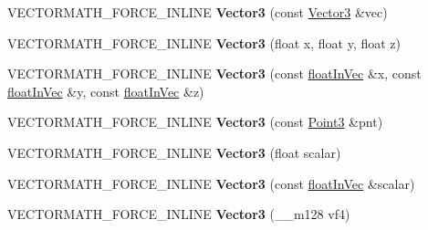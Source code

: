 \begin{DoxyCompactItemize}
\item 
\mbox{\label{classVectormath_1_1Aos_1_1Vector3_ac61c5909c53f4daf35a4950a94de9b1d}} 
V\+E\+C\+T\+O\+R\+M\+A\+T\+H\+\_\+\+F\+O\+R\+C\+E\+\_\+\+I\+N\+L\+I\+NE {\bfseries Vector3} (const \hyperlink{classVectormath_1_1Aos_1_1Vector3}{Vector3} \&vec)
\item 
\mbox{\label{classVectormath_1_1Aos_1_1Vector3_a0cded5830f3b42d3983f187fb2716f4f}} 
V\+E\+C\+T\+O\+R\+M\+A\+T\+H\+\_\+\+F\+O\+R\+C\+E\+\_\+\+I\+N\+L\+I\+NE {\bfseries Vector3} (float x, float y, float z)
\item 
\mbox{\label{classVectormath_1_1Aos_1_1Vector3_a874d7dcc3d4a96d00811606f9e6fc701}} 
V\+E\+C\+T\+O\+R\+M\+A\+T\+H\+\_\+\+F\+O\+R\+C\+E\+\_\+\+I\+N\+L\+I\+NE {\bfseries Vector3} (const \hyperlink{classVectormath_1_1floatInVec}{float\+In\+Vec} \&x, const \hyperlink{classVectormath_1_1floatInVec}{float\+In\+Vec} \&y, const \hyperlink{classVectormath_1_1floatInVec}{float\+In\+Vec} \&z)
\item 
\mbox{\label{classVectormath_1_1Aos_1_1Vector3_a5c4725284242af1e99b5ab244c03ad2e}} 
V\+E\+C\+T\+O\+R\+M\+A\+T\+H\+\_\+\+F\+O\+R\+C\+E\+\_\+\+I\+N\+L\+I\+NE {\bfseries Vector3} (const \hyperlink{classVectormath_1_1Aos_1_1Point3}{Point3} \&pnt)
\item 
\mbox{\label{classVectormath_1_1Aos_1_1Vector3_aa64785a6836fa840d949fecd6d419721}} 
V\+E\+C\+T\+O\+R\+M\+A\+T\+H\+\_\+\+F\+O\+R\+C\+E\+\_\+\+I\+N\+L\+I\+NE {\bfseries Vector3} (float scalar)
\item 
\mbox{\label{classVectormath_1_1Aos_1_1Vector3_a417c78c1d67cbdb9a1d25b491b869363}} 
V\+E\+C\+T\+O\+R\+M\+A\+T\+H\+\_\+\+F\+O\+R\+C\+E\+\_\+\+I\+N\+L\+I\+NE {\bfseries Vector3} (const \hyperlink{classVectormath_1_1floatInVec}{float\+In\+Vec} \&scalar)
\item 
\mbox{\label{classVectormath_1_1Aos_1_1Vector3_a2e444557932c1115952cc60231913e7e}} 
V\+E\+C\+T\+O\+R\+M\+A\+T\+H\+\_\+\+F\+O\+R\+C\+E\+\_\+\+I\+N\+L\+I\+NE {\bfseries Vector3} (\+\_\+\+\_\+m128 vf4)

\end{DoxyCompactItemize}

